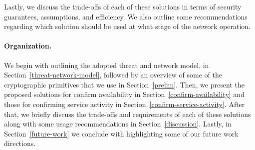 Lastly, we discuss the trade-offs of each of these solutions in terms of security guarantees, assumptions, and efficiency. We also outline some recommendations regarding which solution should be used at what stage of the network operation. 


\paragraph{\bf Organization.}
We begin with outlining the adopted threat and network model, in Section~\ref{threat-network-model}, followed by an overview of some of the cryptographic primitives that we use in Section~\ref{prelim}. Then, we present the proposed solutions for confirm availability in Section~\ref{confirm-availability} and those for confirming service activity in Section~\ref{confirm-service-activity}. After that, we briefly discuss the trade-offs and requirements of each of these solutions along with some usage recommendations in Section~\ref{discussion}. Lastly, in Section~\ref{future-work} we conclude with highlighting some of our future work directions.